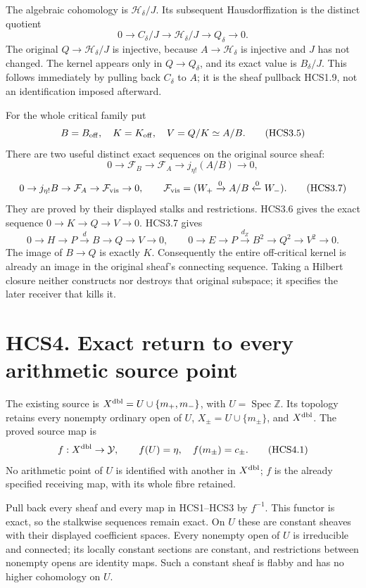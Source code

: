 The algebraic cohomology is \(\mathcal H_\delta/J\). Its subsequent
Hausdorffization is the distinct quotient \[
0\to C_\delta/J\to\mathcal H_\delta/J\to Q_\delta\to0.
\tag{HCS3.4}
\] The original \(Q\to\mathcal H_\delta/J\) is injective, because
\(A\to\mathcal H_\delta\) is injective and \(J\) has not changed. The
kernel appears only in \(Q\to Q_\delta\), and its exact value is
\(B_\delta/J\). This follows immediately by pulling back \(C_\delta\) to
\(A\); it is the sheaf pullback HCS1.9, not an identification imposed
afterward.

For the whole critical family put \[
B=B_{\rm off},\quad K=K_{\rm off},\quad V=Q/K\simeq A/B.
\tag{HCS3.5}
\] There are two useful distinct exact sequences on the original source
sheaf: \[
0\to\mathcal F_B\to\mathcal F_A\to j_{\eta!}(A/B)\to0,
\tag{HCS3.6}
\] \[
0\to j_{\eta!}B\to\mathcal F_A\to
\mathcal F_{\rm vis}\to0,\qquad
\mathcal F_{\rm vis}=(W_+\xrightarrow0A/B\xleftarrow0W_-).
\tag{HCS3.7}
\] They are proved by their displayed stalks and restrictions. HCS3.6
gives the exact sequence \(0\to K\to Q\to V\to0\). HCS3.7 gives \[
0\to H\to P\xrightarrow d B\to Q\to V\to0,
\qquad
0\to E\to P\xrightarrow{d_Z}B^2\to Q^2\to V^2\to0.
\tag{HCS3.8}
\] The image of \(B\to Q\) is exactly \(K\). Consequently the entire
off-critical kernel is already an image in the original sheaf's
connecting sequence. Taking a Hilbert closure neither constructs nor
destroys that original subspace; it specifies the later receiver that
kills it.

\section{HCS4. Exact return to every arithmetic source
point}\label{hcs4.-exact-return-to-every-arithmetic-source-point}

The existing source is \(X^{\rm dbl}=U\cup\{m_+,m_-\}\), with
\(U=\operatorname{Spec}\mathbb Z\). Its topology retains every nonempty
ordinary open of \(U\), \(X_\pm=U\cup\{m_\pm\}\), and \(X^{\rm dbl}\).
The proved source map is \[
f:X^{\rm dbl}\to\mathcal Y,\qquad
f(U)=\eta,\quad f(m_\pm)=c_\pm.
\tag{HCS4.1}
\] No arithmetic point of \(U\) is identified with another in
\(X^{\rm dbl}\); \(f\) is the already specified receiving map, with its
whole fibre retained.

Pull back every sheaf and every map in HCS1--HCS3 by \(f^{-1}\). This
functor is exact, so the stalkwise sequences remain exact. On \(U\)
these are constant sheaves with their displayed coefficient spaces.
Every nonempty open of \(U\) is irreducible and connected; its locally
constant sections are constant, and restrictions between nonempty opens
are identity maps. Such a constant sheaf is flabby and has no higher
cohomology on \(U\).

